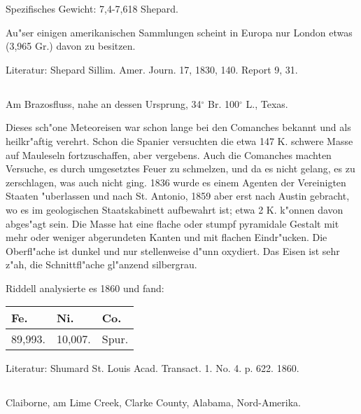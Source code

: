 \documentclass[a4paper, 11pt, oneside]{article}
\begin{document}
Spezifisches Gewicht: 7,4-7,618 Shepard.

Au"ser einigen amerikanischen Sammlungen scheint in Europa nur London etwas (3,965 Gr.) davon zu besitzen.

\normalsize
Literatur: Shepard Sillim. Amer. Journ. 17, 1830, 140. Report 9, 31.

\subsection{}
\LARGE
\paragraph{}
Am Brazosfluss, nahe an dessen Ursprung, 34$^\circ$ Br. 100$^\circ$ L., Texas.

Dieses sch"one Meteoreisen war schon lange bei den Comanches bekannt und als heilkr"aftig verehrt. Schon die Spanier versuchten die etwa 147 K. schwere Masse auf Mauleseln fortzuschaffen, aber vergebens. Auch die Comanches machten Versuche, es durch umgesetztes Feuer zu schmelzen, und da es nicht gelang, es zu zerschlagen, was auch nicht ging. 1836 wurde es einem Agenten der Vereinigten Staaten "uberlassen und nach St. Antonio, 1859 aber erst nach Austin gebracht, wo es im geologischen Staatskabinett aufbewahrt ist; etwa 2 K. k"onnen davon abges"agt sein. Die Masse hat eine flache oder stumpf pyramidale Gestalt mit mehr oder weniger abgerundeten Kanten und mit flachen Eindr"ucken. Die Oberfl"ache ist dunkel und nur stellenweise d"unn oxydiert. Das Eisen ist sehr z"ah, die Schnittfl"ache gl"anzend silbergrau.

Riddell analysierte es 1860 und fand:
\begin{table}[H]
    \centering\swabfamily\Large
    \begin{tabular}{l l l}
        Fe. & Ni. & Co. \\ \hline
        89,993. & 10,007. & Spur. \\
    \end{tabular}
\end{table}

\normalsize
Literatur: Shumard St. Louis Acad. Transact. 1. No. 4. p. 622. 1860.

\subsection{}
\LARGE
\paragraph{}
Claiborne, am Lime Creek, Clarke County, Alabama, Nord-Amerika.
\end{document}
